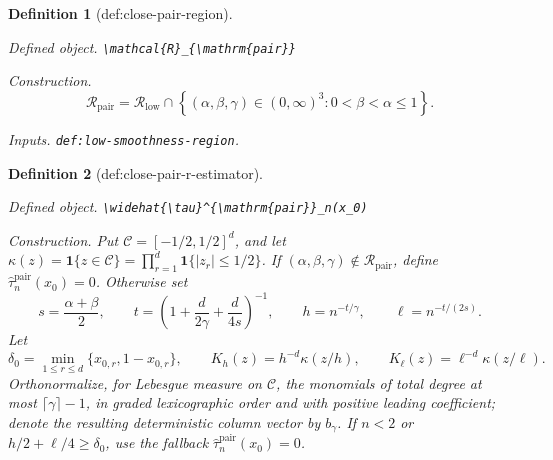 \documentclass{article}
\newtheorem{definition}{Definition}
\begin{document}
\begin{definition}[def:close-pair-region]\label{def:close-pair-region}
\par\smallskip\noindent\emph{Defined object.} \texttt{\textbackslash{}\allowbreak{}mathcal\{R\}\allowbreak{}\_\allowbreak{}\{\textbackslash{}\allowbreak{}mathrm\{pair\}\allowbreak{}\}\allowbreak{}}
\par\smallskip\noindent\emph{Construction.} \[
\mathcal R_{\mathrm{pair}}
=\mathcal R_{\mathrm{low}}\cap
\left\{(\alpha,\beta,\gamma)\in(0,\infty)^3:
0<\beta<\alpha\leq 1\right\}.
\]
\par\smallskip\noindent\emph{Inputs.} \texttt{def:\allowbreak{}low-\allowbreak{}smoothness-\allowbreak{}region}.
\end{definition}

\begin{definition}[def:close-pair-r-estimator]\label{def:close-pair-r-estimator}
\par\smallskip\noindent\emph{Defined object.} \texttt{\textbackslash{}\allowbreak{}widehat\{\textbackslash{}\allowbreak{}tau\}\allowbreak{}\textasciicircum{}\{\textbackslash{}\allowbreak{}mathrm\{pair\}\allowbreak{}\}\allowbreak{}\_\allowbreak{}n(x\_\allowbreak{}0)}
\par\smallskip\noindent\emph{Construction.} Put \(\mathcal C=[-1/2,1/2]^d\), and let
\(\kappa(z)=\mathbf 1\{z\in\mathcal C\}=\prod_{r=1}^d
\mathbf 1\{|z_r|\leq1/2\}\).  If
\((\alpha,\beta,\gamma)\notin\mathcal R_{\mathrm{pair}}\), define
\(\widehat\tau_n^{\mathrm{pair}}(x_0)=0\).  Otherwise set
\[
s=\frac{\alpha+\beta}{2},\qquad
t=\left(1+\frac d{2\gamma}+\frac d{4s}\right)^{-1},
\qquad h=n^{-t/\gamma},\qquad \ell=n^{-t/(2s)}.
\]
Let
\[
\delta_0=\min_{1\leq r\leq d}\{x_{0,r},1-x_{0,r}\},
\qquad
K_h(z)=h^{-d}\kappa(z/h),
\qquad K_\ell(z)=\ell^{-d}\kappa(z/\ell).
\]
Orthonormalize, for Lebesgue measure on \(\mathcal C\), the monomials of
total degree at most \(\lceil\gamma\rceil-1\), in graded lexicographic order
and with positive leading coefficient; denote the resulting deterministic
column vector by \(b_\gamma\).  If \(n<2\) or
\(h/2+\ell/4\geq\delta_0\), use the fallback
\(\widehat\tau_n^{\mathrm{pair}}(x_0)=0\).


\end{definition}
\end{document}
